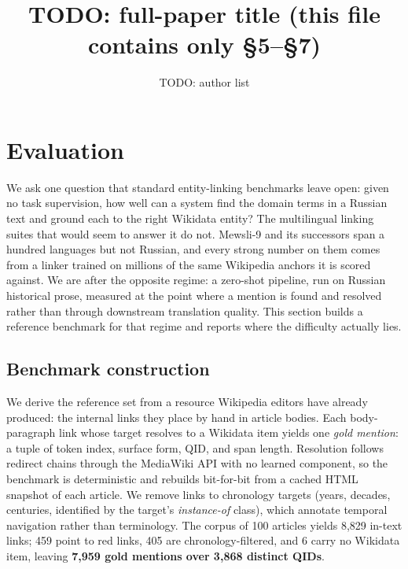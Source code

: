 \documentclass[sigconf,review]{acmart}
\begin{document}
\title{TODO: full-paper title (this file contains only \S5--\S7)}
\author{TODO: author list}

\maketitle

\setcounter{section}{4} %

\section{Evaluation}
\label{sec:evaluation}

We ask one question that standard entity-linking benchmarks leave open: given
no task supervision, how well can a system find the domain terms in a Russian
text and ground each to the right Wikidata entity? The multilingual linking
suites that would seem to answer it do not. Mewsli-9 and its successors span a
hundred languages but not Russian, and every strong number on them comes from a
linker trained on millions of the same Wikipedia anchors it is scored against.
We are after the opposite regime: a zero-shot pipeline, run on Russian
historical prose, measured at the point where a mention is found and resolved
rather than through downstream translation quality. This section builds a
reference benchmark for that regime and reports where the difficulty actually
lies.

\subsection{Benchmark construction}
\label{sec:benchmark-construction}

We derive the reference set from a resource Wikipedia editors have already
produced: the internal links they place by hand in article bodies. Each
body-paragraph link whose target resolves to a Wikidata item yields one
\emph{gold mention}: a tuple of token index, surface form, QID, and span
length. Resolution follows redirect chains through the MediaWiki API with no
learned component, so the benchmark is deterministic and rebuilds bit-for-bit
from a cached HTML snapshot of each article. We remove links to chronology
targets (years, decades, centuries, identified by the target's
\emph{instance-of} class), which annotate temporal navigation rather than
terminology. The corpus of 100 articles yields 8,829 in-text links; 459 point to red links, 405 are
chronology-filtered, and 6 carry no Wikidata item, leaving \textbf{7,959 gold
mentions over 3,868 distinct QIDs}.
\end{document}
